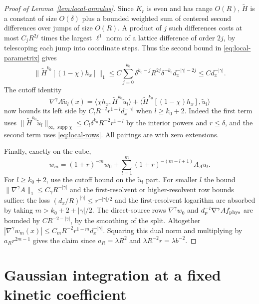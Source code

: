 \documentclass[11pt]{article}
\theoremstyle{definition}
\newcommand{\supp}{\operatorname{supp}}
\begin{document}
\begin{proof}[Proof of Lemma~\ref{lem:local-annulus}]
Since \(K_r\) is even and has range \(O(R)\),
\(\widetilde H\) is a constant of size \(O(\delta)\) plus
a bounded weighted sum of centered second differences over
jumps of size \(O(R)\). A product of \(j\) such differences
costs at most \(C_jR^{2j}\) times the largest \(\ell^1\)
norm of a lattice difference of order \(2j\), by telescoping
each jump into coordinate steps. Thus the second bound in
\eqref{eq:local-parametrix} gives
\begin{equation}
 \|\widetilde H^{k_0}[(1-\chi)h_x]\|_1
 \le C \sum_{j=0}^{k_0}
   \delta^{k_0-j}R^{2j}\delta^{-k_0}d_x^{-|\gamma|-2j}
 \le C d_x^{-|\gamma|}.
\end{equation}
The cutoff identity
\begin{equation}
 \nabla^\gamma A\widetilde u_l(x)
 =\langle \chi h_x,\widetilde H^{k_0}\widetilde u_l\rangle
  +\langle \widetilde H^{k_0}[(1-\chi)h_x],
                  \widetilde u_l\rangle
\end{equation}
now bounds its left side by \(C_lR^{-2}r^{1-l}d_x^{-|\gamma|}\)
when \(l\ge k_0+2\). Indeed the first term uses
\(\|\widetilde H^{k_0}\widetilde u_l\|_{\infty,\,\supp\chi}
 \le C_l\delta^{k_0}R^{-2}r^{1-l}\) by the interior powers
and \(r\le\delta\), and the second term uses
\eqref{eq:local-rows}. All pairings are with zero extensions.

Finally, exactly on the cube,
\begin{equation}
 w_m=(1+r)^{-m}w_0+
             \sum_{l=1}^m(1+r)^{-(m-l+1)}A_\Lambda u_l .
\end{equation}
For \(l\ge k_0+2\), use the cutoff bound on the
\(\widetilde u_l\) part. For smaller \(l\) the bound
\(\|\nabla^\gamma A\|_1\le C_\gamma R^{-|\gamma|}\)
and the first-resolvent or higher-resolvent row bounds
suffice: the loss \((d_x/R)^{|\gamma|}\le r^{-|\gamma|/2}\)
and the first-resolvent logarithm are absorbed by taking
\(m>k_0+2+|\gamma|/2\). The direct-source rows
\(\nabla^\gamma w_0\) and
\(d_p^{-l}\nabla^\gamma A f_{\rm phys}\) are bounded by
\(C R^{-2-|\gamma|}\), by the smoothing of the split.
Altogether \(|\nabla^\gamma w_m(x)|\le
C_m R^{-2}r^{1-m}d_x^{-|\gamma|}\).
Squaring this dual norm and multiplying by \(a_Rr^{2m-1}\)
gives the claim since \(a_R=\lambda R^2\) and
\(\lambda R^{-2}r=\lambda b^{-2}\).
\end{proof}

\section{Gaussian integration at a fixed kinetic coefficient}
\label{app:fixed-kinetic}
\end{document}
